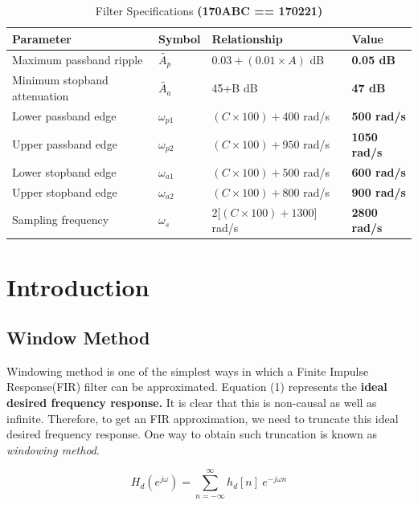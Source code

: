\documentclass[11pt]{article}
\begin{document}
% 
\begin{table}[H]
\centering
\caption{Filter Specifications {\bf (170ABC == 170221)} }
\label{tab:filter-specs}
\begin{tabular}{@{}llll@{}}
\toprule
\textbf{Parameter}    & \textbf{Symbol}        & \textbf{Relationship}         & \textbf{Value}      \\ \midrule
Maximum passband ripple & $\tilde{A_p}$    & $0.03 + (0.01 \times A)$ dB          & \textbf{0.05 dB}       \\
Minimum stopband attenuation & $\tilde{A_a}$ & 45+B dB                       & \textbf{47 dB}      \\
Lower passband edge& $\omega_{p1}$        & $(C \times 100) + 400$ rad/s         & \textbf{500 rad/s}  \\
Upper passband edge& $\omega_{p2}$         & $(C \times 100) + 950$ rad/s        & \textbf{1050 rad/s} \\
Lower stopband edge& $\omega_{a1}$          & $(C \times 100) + 500$ rad/s         & \textbf{600 rad/s}  \\
Upper stopband edge& $\omega_{a2}$          & $(C \times 100) + 800$ rad/s         & \textbf{900 rad/s}  \\
Sampling frequency&  $\omega_{s}$          & $2{[}(C \times 100) + 1300{]}$ rad/s & \textbf{2800 rad/s} \\ \bottomrule
\end{tabular}
\end{table}


\section{Introduction} 

\subsection{Window Method}

Windowing method is one of the simplest ways in which a Finite Impulse Response(FIR) filter can be approximated. 
Equation (1) represents the {\bf ideal desired frequency response.} It is clear that this is non-causal as well as infinite. Therefore, to get an FIR approximation, we need to truncate this ideal desired frequency response. One way to obtain such truncation is known as {\it windowing method}.

\begin{equation}
H_{d}\left( e^{j\omega }\right) =\sum ^{\infty }_{n=-\infty } h_{d}[ n] \ e^{-j\omega n}
\end{equation}
\end{document}
